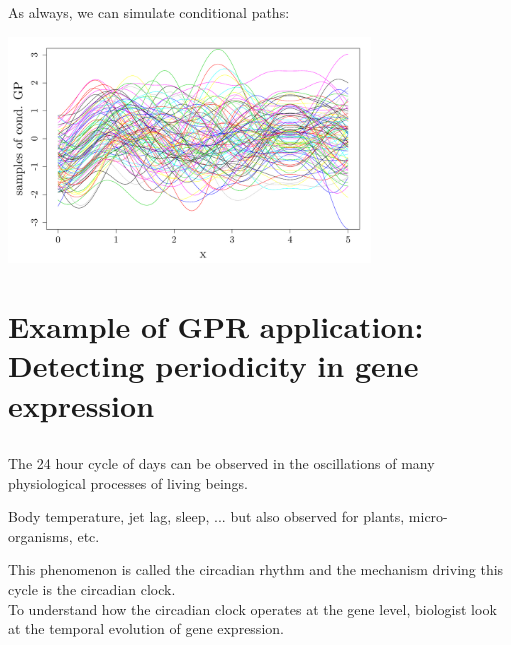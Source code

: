 \documentclass{beamer}
\begin{document}
\begin{frame}{}
As always, we can simulate conditional paths:
	\begin{center}
	\includegraphics[height=6cm]{figures/R/exotic_simul}
	\end{center}
\end{frame}

\section[GPR Application]{Example of GPR application: Detecting periodicity in gene expression}
\subsection{}

\begin{frame}{}
The 24 hour cycle of days can be observed in the oscillations of many physiological processes of living beings.\\
\begin{examples}
 Body temperature, jet lag, sleep, ... but also observed for plants, micro-organisms, etc.
\end{examples}
\vspace{0.5cm}
This phenomenon is called the \alert{circadian rhythm} and the mechanism driving this cycle is the \alert{circadian clock}. \\
\vspace{0.5cm}
To understand how the circadian clock operates at the gene level, biologist look at the temporal evolution of gene expression. 
\end{frame}
\end{document}
